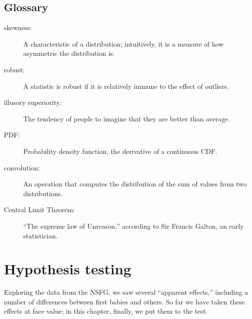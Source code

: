 \documentclass[12pt]{book}
\begin{document}
\section{Glossary}

\begin{description}

\item[skewness:] A characteristic of a distribution; intuitively, it
is a measure of how asymmetric the distribution is.

\item[robust:] A statistic is robust if it is relatively immune to the
  effect of outliers.

\item[illusory superiority:] The tendency of people to imagine that
they are better than average.

\item[PDF:] Probability density function, the derivative of a continuous CDF.

\item[convolution:] An operation that computes the distribution of the
sum of values from two distributions. 



\item[Central Limit Theorem:] ``The supreme law of Unreason,'' according
to Sir Francis Galton, an early statistician.

\end{description}


\chapter{Hypothesis testing}
\label{testing}

Exploring the data from the NSFG, we saw several ``apparent effects,''
including a number of differences between first babies and others.
So far we have taken these effects at face value; in this chapter,
finally, we put them to the test.
\end{document}
